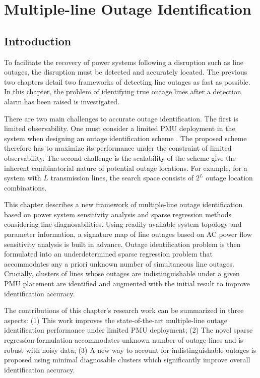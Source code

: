 
\chapter{Multiple-line Outage Identification}
\label{ch:identification}
\vspace{2em}

\section{Introduction} %
\label{ch5:sec:introduction}

To facilitate the recovery of power systems following a disruption such as line outages, the disruption must be detected and accurately located. The previous two chapters detail two frameworks of detecting line outages as fast as possible. In this chapter, the problem of identifying true outage lines after a detection alarm has been raised is investigated. 

There are two main challenges to accurate outage identification. The first is limited observability. One must consider a limited PMU deployment in the system when designing an outage identification scheme \cite{aminifar2014synchrophasor}. The proposed scheme therefore has to maximize its performance under the constraint of limited observability. The second challenge is the scalability of the scheme give the inherent combinatorial nature of potential outage locations. For example, for a system with $L$ transmission lines, the search space consists of $2^L$ outage location combinations.

This chapter describes a new framework of multiple-line outage identification based on power system sensitivity analysis and sparse regression methods considering line diagnosabilities. Using readily available system topology and parameter information, a signature map of line outages based on AC power flow sensitivity analysis is built in advance. Outage identification problem is then formulated into an underdetermined sparse regression problem that accommodates any a priori unknown number of simultaneous line outages. Crucially, clusters of lines whose outages are indistinguishable under a given PMU placement are identified and augmented with the initial result to improve identification accuracy. 

The contributions of this chapter's research work can be summarized in three aspects: (1) This work improves the state-of-the-art multiple-line outage identification performance under limited PMU deployment; (2) The novel sparse regression formulation accommodates unknown number of outage lines and is robust with noisy data; (3) A new way to account for indistinguishable outages is proposed using minimal diagnosable clusters which significantly improve overall identification accuracy.

